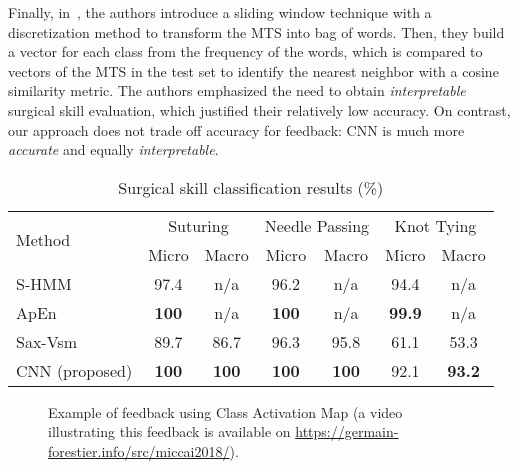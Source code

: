 \documentclass{llncs}
\begin{document}
Finally, in~\cite{forestier2017discovering}, the authors introduce a sliding window technique with a discretization method to transform the MTS into bag of words. 
Then, they build a vector for each class from the frequency of the words, which is compared to vectors of the MTS in the test set to identify the nearest neighbor with a cosine similarity metric.   
The authors emphasized the need to obtain \emph{interpretable} surgical skill evaluation, which justified their relatively low accuracy. 
On contrast, our approach does not trade off accuracy for feedback: CNN is much more \emph{accurate} and equally \emph{interpretable}.   
\begin{table}
	\centering
	\caption{Surgical skill classification results (\%)}
	\begin{tabular}{l|cc|cc|cc}
		\toprule
		\multirow{2}{*}{\scriptsize Method} &
		\multicolumn{2}{c}{\scriptsize Suturing} &
		\multicolumn{2}{c}{\scriptsize Needle Passing} &
		\multicolumn{2}{c}{\scriptsize Knot Tying} \\
		& {\scriptsize Micro} & {\scriptsize Macro} & {\scriptsize Micro} & {\scriptsize Macro} & {\scriptsize Micro} & {\scriptsize Macro} \\
		\midrule
		S-HMM~\cite{lingling2012sparse} & 97.4 & n/a  & 96.2 & n/a & 94.4 & n/a \\
		ApEn~\cite{zia2017automated} & \textbf{100} & n/a & \textbf{100} & n/a & \textbf{99.9} & n/a \\
		Sax-Vsm~\cite{forestier2017discovering} & 89.7 & 86.7 & 96.3 & 95.8 & 61.1 & 53.3 \\
		CNN (proposed) & \textbf{100} & \textbf{100} & \textbf{100} & \textbf{100} & 92.1 & \textbf{93.2} \\
		\bottomrule
	\end{tabular}
    \label{table:results}
\end{table}

\begin{figure}
\centering
{}
 \hspace{.1cm}
    \caption{Example of feedback using Class Activation Map (a video illustrating this feedback is available on \url{https://germain-forestier.info/src/miccai2018/}).
    }
    \label{fig:trials}
\end{figure}
\end{document}
